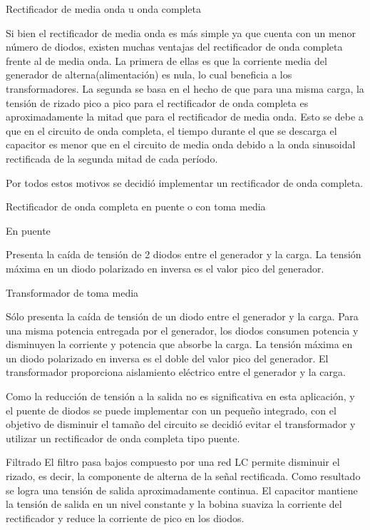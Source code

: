 Rectificador de media onda u onda completa

Si bien el rectificador de media onda es más simple ya que cuenta con un menor número de diodos, existen muchas ventajas del rectificador de onda completa frente al de media onda. 
La primera de ellas es que la corriente media del generador de alterna(alimentación) es nula, lo cual beneficia a los transformadores. 
La segunda se basa en el hecho de que para una misma carga, la tensión de rizado pico a pico para el rectificador de onda completa es aproximadamente la mitad que para el rectificador de media onda. 
Esto se debe a que en el circuito de onda completa, el tiempo durante el que se descarga el capacitor es menor que en el circuito de media onda debido a la onda sinusoidal rectificada de la segunda mitad de cada período. 

Por todos estos motivos se decidió implementar un rectificador de onda completa.

Rectificador de onda completa en puente o con toma media

En puente

Presenta la caída de tensión de 2 diodos entre el generador y la carga. 
La tensión máxima en un diodo polarizado en inversa es el valor pico del generador.

Transformador de toma media

Sólo presenta la caída de tensión de un diodo entre el generador y la carga. 
Para una misma potencia entregada por el generador, los diodos consumen potencia y disminuyen la corriente y potencia que absorbe la carga. 
La tensión máxima en un diodo polarizado en inversa es el doble del valor pico del generador.
El transformador proporciona aislamiento eléctrico entre el generador y la carga. 

Como la reducción de tensión a la salida no es significativa en esta aplicación, y el puente de diodos se puede implementar con un pequeño integrado, con el objetivo de disminuir el tamaño del circuito se decidió evitar el transformador y utilizar un rectificador de onda completa tipo puente.

Filtrado
El filtro pasa bajos compuesto por una red LC permite disminuir el rizado, es decir, la componente de alterna de la señal rectificada. 
Como resultado se logra una tensión de salida aproximadamente continua.
El capacitor mantiene la tensión de salida en un nivel constante y la bobina suaviza la corriente del rectificador y reduce la corriente de pico en los diodos. 

